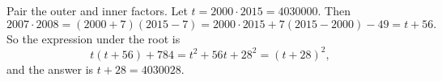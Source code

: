 Pair the outer and inner factors. Let $t=2000\cdot2015=4030000$. Then
\[2007\cdot2008=(2000+7)(2015-7)=2000\cdot2015+7(2015-2000)-49=t+56 .\]
So the expression under the root is
\[t(t+56)+784=t^2+56t+28^2=(t+28)^2,\]
and the answer is $t+28=\boxed{4030028}$.
